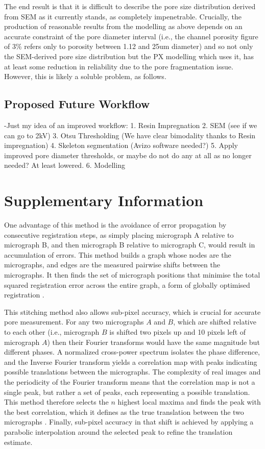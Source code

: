 \documentclass[review]{elsarticle}
\begin{document}
  The end result is that it is difficult to describe the pore size distribution
  derived from SEM as it currently stands, as completely impenetrable.
  Crucially, the production of reasonable results from the modelling as above
  depends on an accurate constraint of the pore diameter interval (i.e., the
  channel porosity figure of 3\% refers only to porosity between 1.12 and 25um
  diameter) and so not only the SEM-derived pore size distribution but the PX
  modelling which uses it, has at least some reduction in reliability due to the
  pore fragmentation issue. However, this is likely a soluble problem, as follows.

  \subsection{Proposed Future Workflow}

  -Just my idea of an improved workflow:
  1. Resin Impregnation
  2. SEM (see if we can go to 2kV)
  3. Otsu Thresholding (We have clear bimodality thanks to Resin impregnation)
  4. Skeleton segmentation (Avizo software needed?)
  5. Apply improved pore diameter thresholds, or maybe do not do any at all as no longer needed? At least lowered.
  6. Modelling

\section{Supplementary Information}

One advantage of this method is the avoidance of error propagation by
consecutive registration steps, as simply placing micrograph A relative to
micrograph B, and then micrograph B relative to micrograph C, would result in
accumulation of errors. This method builds a graph whose nodes are the
micrographs, and edges are the measured pairwise shifts between the micrographs.
It then finds the set of micrograph positions that minimise the total squared
registration error across the entire graph, a form of globally optimised
registration \citep{Preibisch2009}.

This stitching method also allows sub-pixel accuracy, which is crucial for
accurate pore measurement. For any two micrographs \(A\) and \(B\), which are
shifted relative to each other (i.e., micrograph \(B\) is shifted two pixels up
and 10 pixels left of micrograph \(A\)) then their Fourier transforms would
have the same magnitude but different phases. A normalized cross-power spectrum
isolates the phase difference, and the Inverse Fourier transform
yields a correlation map with peaks indicating possible translations between the
micrographs. The complexity of real images and the periodicity of the Fourier
transform means that the correlation map is not a single peak, but rather a set
of peaks, each representing a possible translation. This method therefore
selects the \(n\) highest local maxima and finds the peak with the best
correlation, which it defines as the true translation between the two
micrographs \citep{Preibisch2009}. Finally, sub-pixel accuracy in that shift is
achieved by applying a parabolic interpolation around the selected peak to
refine the translation estimate.
\end{document}
